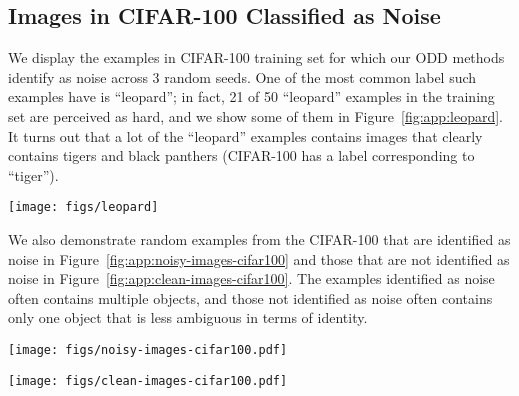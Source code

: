 \documentclass[a4paper,11pt]{article}
\begin{document}
\subsection{Images in CIFAR-100 Classified as Noise}
\label{sec:app:noisy-cifar}
We display the examples in CIFAR-100 training set for which our \textsc{ODD} methods identify as noise across 3 random seeds. One of the most common label such examples have is ``leopard''; in fact, 21 of 50 ``leopard'' examples in the training set are perceived as hard, and we show some of them in Figure~\ref{fig:app:leopard}. It turns out that a lot of the ``leopard'' examples contains images that clearly contains tigers and black panthers (CIFAR-100 has a label corresponding to ``tiger'').

\begin{figure*}[htbp]
    \centering
    \texttt{[image: figs/leopard]}
    \caption{Examples with label ``leopard'' that are classified as noise.}
    \label{fig:app:leopard}
\end{figure*}

We also demonstrate random examples from the CIFAR-100 that are identified as noise in Figure~\ref{fig:app:noisy-images-cifar100} and those that are not identified as noise in Figure~\ref{fig:app:clean-images-cifar100}. The examples identified as noise often contains multiple objects, and those not identified as noise often contains only one object that is less ambiguous in terms of identity.


\begin{figure*}[htbp]
    \centering
    \texttt{[image: figs/noisy-images-cifar100.pdf]}
    \caption{Random CIFAR-100 examples that are classified as noise.}
    \label{fig:app:noisy-images-cifar100}
\end{figure*}

\begin{figure*}[htbp]
    \centering
    \texttt{[image: figs/clean-images-cifar100.pdf]}
    \caption{Random CIFAR-100 examples that are not classified as noise.}
    \label{fig:app:clean-images-cifar100}
\end{figure*} 
\end{document}
